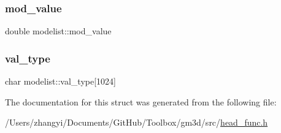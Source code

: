\mbox{\label{structmodelist_a8202a807f9745943756610b00ab82a3a}} 
\subsubsection{\texorpdfstring{mod\_value}{mod\_value}}
{\footnotesize\ttfamily double modelist\+::mod\+\_\+value}

\mbox{\label{structmodelist_a021d603ad90c192eb29a62dc8937f4c6}} 
\subsubsection{\texorpdfstring{val\_type}{val\_type}}
{\footnotesize\ttfamily char modelist\+::val\+\_\+type\mbox{[}1024\mbox{]}}



The documentation for this struct was generated from the following file\+:\begin{DoxyCompactItemize}
\item 
/\+Users/zhangyi/\+Documents/\+Git\+Hub/\+Toolbox/gm3d/src/\mbox{\hyperlink{head__func_8h}{head\+\_\+func.\+h}}\end{DoxyCompactItemize}
